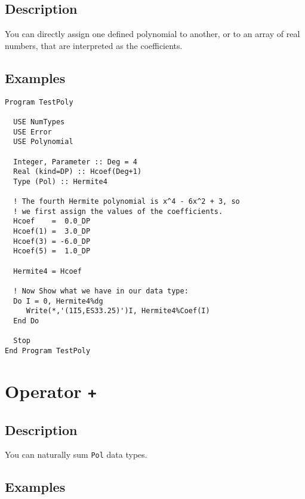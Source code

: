 \subsection{Description}

You can directly assign one defined polynomial to another, or to an
array of real numbers, that are interpreted as the coefficients. 

\subsection{Examples}


\begin{lstlisting}[emph=Type,
                   emphstyle=\color{blue},
                   frame=trBL,
                   caption=Assigning polynomials.,
                   label=assignpol]
Program TestPoly

  USE NumTypes
  USE Error
  USE Polynomial

  Integer, Parameter :: Deg = 4
  Real (kind=DP) :: Hcoef(Deg+1)
  Type (Pol) :: Hermite4

  ! The fourth Hermite polynomial is x^4 - 6x^2 + 3, so
  ! we first assign the values of the coefficients.
  Hcoef    =  0.0_DP
  Hcoef(1) =  3.0_DP
  Hcoef(3) = -6.0_DP
  Hcoef(5) =  1.0_DP

  Hermite4 = Hcoef

  ! Now Show what we have in our data type:
  Do I = 0, Hermite4%dg
     Write(*,'(1I5,ES33.25)')I, Hermite4%Coef(I)
  End Do

  Stop
End Program TestPoly
\end{lstlisting}

\section{Operator \texttt{+}}

\subsection{Description}

You can naturally sum \texttt{Pol} data types.

\subsection{Examples}

